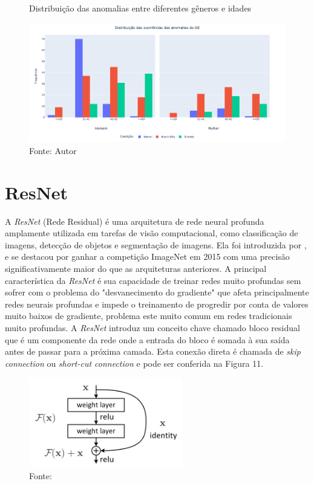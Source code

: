 \begin{figure}[htbp]
    \centering
    \caption{Distribuição das anomalias entre diferentes gêneros e idades}
    \includegraphics[width=1\textwidth]{figures/fig012.png}
    \caption*{Fonte: Autor}
    \label{fig:fig012}
\end{figure}

\section{ResNet}
\label{subsec:cap4_resnet}

A \textit{ResNet} (Rede Residual) é uma arquitetura de rede neural profunda amplamente utilizada em tarefas de visão computacional, como classificação de imagens, detecção de objetos e segmentação de imagens. Ela foi introduzida por  \cite{heDeepResidualLearning2015}, e se destacou por ganhar a competição ImageNet em 2015 com uma precisão significativamente maior do que as arquiteturas anteriores. A principal característica da \textit{ResNet} é sua capacidade de treinar redes muito profundas sem sofrer com o problema do "desvanecimento do gradiente" que afeta principalmente redes neurais profundas e impede o treinamento de progredir por conta de valores muito baixos de gradiente, problema este muito comum em redes tradicionais muito profundas. A \textit{ResNet} introduz um conceito chave chamado bloco residual que é um componente da rede onde a entrada do bloco é somada à sua saída antes de passar para a próxima camada. Esta conexão direta é chamada de \textit{skip connection} ou \textit{short-cut connection} e pode ser conferida na Figura 11.

\begin{figure}[htbp]
    \centering
    \includegraphics[width=0.6\textwidth]{figures/fig013.png}
    \caption{Fonte: \cite{aiSelfAttentionBasedFusion2023}}
    \label{fig:fig013}
\end{figure}

